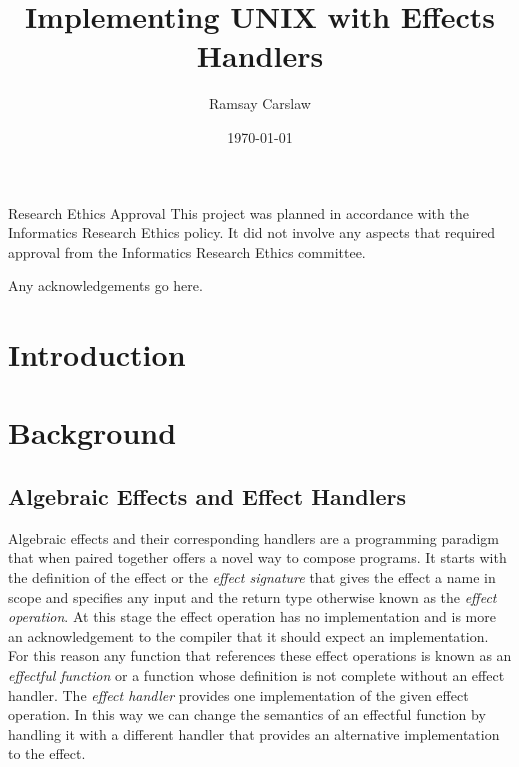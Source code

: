 \documentclass[logo,bsc,singlespacing,parskip]{infthesis}
\begin{document}
\begin{preliminary}

\title{Implementing UNIX with Effects Handlers}
\author{Ramsay Carslaw}


\date{\today}


\maketitle

\newenvironment{ethics}
   {\begin{frontenv}{Research Ethics Approval}{\LARGE}}
   {\end{frontenv}\newpage}

\begin{ethics}
This project was planned in accordance with the Informatics Research
Ethics policy. It did not involve any aspects that required approval
from the Informatics Research Ethics committee.

\standarddeclaration
\end{ethics}

\begin{acknowledgements}
  Any acknowledgements go here.
\end{acknowledgements}

\tableofcontents

\end{preliminary}

\chapter{Introduction}

\chapter{Background}

\section{Algebraic Effects and Effect Handlers}

Algebraic effects \cite{plotkin2002computational} and their corresponding
handlers \cite{plotkin2009handlers} \cite{pretnar2015introduction} are a
programming paradigm that when paired together offers a novel way to compose
programs. It starts with the definition of the effect or the \emph{effect
signature} that gives the effect a name in scope and specifies any input and
the return type otherwise known as the \emph{effect operation}. At this stage
the effect operation has no implementation and is more an acknowledgement to
the compiler that it should expect an implementation. For this reason any
function that references these effect operations is known as an \emph{effectful
function} or a function whose definition is not complete without an effect
handler. The \emph{effect handler} provides one implementation of the given
effect operation. In this way we can change the semantics of an effectful
function by handling it with a different handler that provides an alternative
implementation to the effect. 
\end{document}

